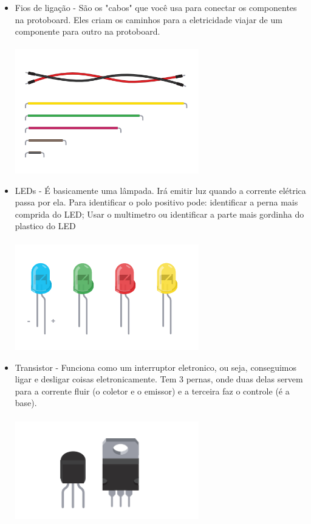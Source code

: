 \documentclass{report}
\begin{document}
\begin{itemize}
		\item Fios de ligação - São os "cabos" que você usa para conectar os componentes na protoboard. Eles criam os caminhos para a eletricidade viajar de um componente para outro na protoboard. \\ \\
		\includegraphics[width=8cm]{imagens/fios_ligacao.png}
		
		\item LEDs - É basicamente uma lâmpada. Irá emitir luz quando a corrente elétrica passa por ela. Para identificar o polo positivo pode: identificar a perna mais comprida do LED; Usar o multimetro ou identificar a parte mais gordinha do plastico do LED \\ \\
		\includegraphics[width=8cm]{imagens/leds.png}
		
		\item Transistor - Funciona como um interruptor eletronico, ou seja, conseguimos ligar e desligar coisas eletronicamente. Tem 3 pernas, onde duas delas servem para a corrente fluir (o coletor e o emissor) e a terceira faz o controle (é a base).   \\ \\
		\includegraphics[width=8cm]{imagens/transistor.png}
		

\end{itemize}
\end{document}
